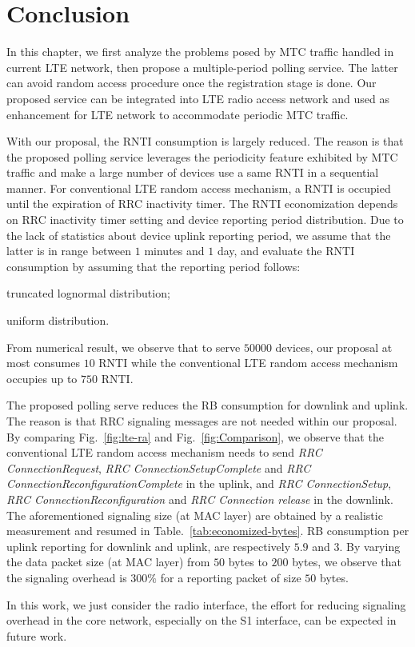 \section{Conclusion}
\label{sec:conclusion}
In this chapter, we first analyze the problems posed by MTC traffic handled in current LTE network, then propose a multiple-period polling service. The latter can avoid random access procedure once the registration stage is done. 
Our proposed service can be integrated into LTE radio access network and used as enhancement for LTE network to accommodate periodic MTC traffic. 

With our proposal, the RNTI consumption is largely reduced. The reason is that the proposed polling service leverages the periodicity feature exhibited by MTC traffic and make a large number of devices use a same RNTI in a sequential manner. For conventional LTE random access mechanism, a RNTI is occupied until the expiration of RRC inactivity timer. The RNTI economization depends on RRC inactivity timer setting and device reporting period distribution. Due to the lack of statistics about device uplink reporting period, we assume that the latter is in range between $1$ minutes and $1$ day, and evaluate the RNTI consumption by assuming that the reporting period follows:\begin{inparaenum}[1)]
	\item truncated lognormal distribution;
	\item uniform distribution. 
\end{inparaenum} From numerical result, we observe that to serve $50000$ devices, our proposal at most consumes $10$ RNTI while the conventional LTE random access mechanism occupies up to $750$ RNTI. 

The proposed polling serve reduces the RB consumption for downlink and uplink. The reason is that RRC signaling messages are not needed within our proposal. By comparing Fig.~\ref{fig:lte-ra} and Fig.~\ref{fig:Comparison}, we observe that the conventional LTE random access mechanism needs to send \emph{RRC ConnectionRequest}, \emph{RRC ConnectionSetupComplete} and \emph{RRC ConnectionReconfigurationComplete} in the uplink, and \emph{RRC ConnectionSetup}, \emph{RRC ConnectionReconfiguration} and \emph{RRC Connection release} in the downlink. The aforementioned signaling size (at MAC layer) are obtained by a realistic measurement and resumed in Table.~\ref{tab:economized-bytes}. RB consumption per uplink reporting for downlink and uplink, are respectively $5.9$ and $3$. 
By varying the data packet size (at MAC layer) from $50$ bytes to $200$ bytes, we observe that the signaling overhead is $300\%$ for a reporting packet of size $50$ bytes.  

In this work, we just consider the radio interface, the effort for reducing signaling overhead in the core network, especially on the S1 interface, can be expected in future work. 